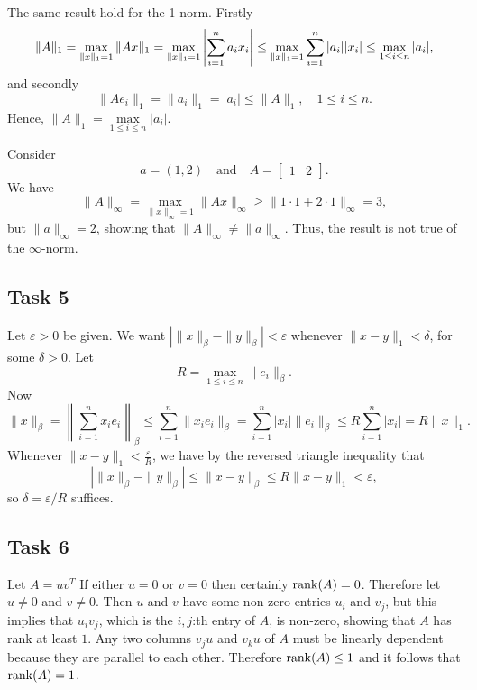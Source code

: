 \documentclass[a4paper,12pt]{article}
\begin{document}
The same result hold for the 1-norm.
Firstly
\[
  \|A\|_1
    = \max_{\|x\|_1 = 1} \|Ax\|_1\\
    = \max_{\|x\|_1 = 1} \left| \sum_{i=1}^n a_i x_i\right|
    \le \max_{\|x\|_1 = 1} \sum_{i=1}^n |a_i||x_i|
    \le \max_{1 \le i \le n} |a_i|,
\]
and secondly
\[ \|Ae_i\|_1 = \|a_i\|_1 = |a_i| \le \|A\|_1, \quad 1 \le i \le n. \]
Hence, $ \|A\|_1=\underset{1\le i \le n}{\max} |a_i|$.

Consider
\[
  a = (1, 2)
  \quad \text{and} \quad
  A =
    \begin{bmatrix}
      1 & 2
    \end{bmatrix}.
\]
We have
\[
  \|A\|_\infty
    = \max_{\|x\|_\infty = 1} \|Ax\|_\infty
    \ge \|1 \cdot 1 + 2 \cdot 1\|_\infty
    = 3,
\]
but \(\|a\|_\infty = 2\), showing that \(\|A\|_\infty \ne
\|a\|_\infty\).
Thus, the result is not true of the \(\infty\)-norm.


\subsection*{Task 5}

Let \(\varepsilon > 0\) be given.
We want \(\left|\|x\|_\beta - \|y\|_\beta\right| < \varepsilon\)
whenever \(\|x-y\|_1 < \delta\), for some \(\delta > 0\).
Let
\[ R = \max_{1 \le i \le n} \|e_i\|_\beta. \]
Now
\[
  \|x\|_\beta
    = \left\|\sum_{i=1}^n x_i e_i\right\|_\beta
    \le \sum_{i=1}^n \|x_i e_i\|_\beta
    = \sum_{i=1}^n |x_i| \|e_i\|_\beta
    \le R \sum_{i=1}^n |x_i|
    = R \|x\|_1.
\]
Whenever \(\|x-y\|_1 < \frac{\varepsilon}{R}\), we have by the reversed
triangle inequality that
\[
  \left|\|x\|_\beta - \|y\|_\beta\right|
    \le \|x - y\|_\beta
    \le R \|x - y\|_1
    < \varepsilon,
\]
so \(\delta = \varepsilon/R\) suffices.


\subsection*{Task 6}

Let \(A = uv^T\)
If either \(u = 0\) or \(v = 0\) then certainly \(\mathrm{rank}(A) = 0\).
Therefore let \(u \ne 0\) and \(v \ne 0\).
Then \(u\) and \(v\) have some non-zero entries \(u_i\) and \(v_j\), but this
implies that \(u_i v_j\), which is the \(i,j\):th entry of \(A\), is non-zero,
showing that \(A\) has rank at least \(1\).
Any two columns \(v_j u\) and \(v_k u\) of \(A\) must be linearly dependent
because they are parallel to each other.
Therefore \(\mathrm{rank}(A) \le 1\) and it follows that \(\mathrm{rank}(A) = 1\).
\end{document}
